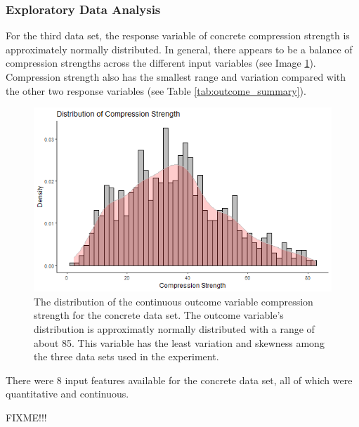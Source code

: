 \documentclass[10pt]{article}\usepackage[]{graphicx}\usepackage[]{xcolor}
\begin{document}
\subsubsection{Exploratory Data Analysis}
For the third data set, the response variable of concrete compression strength is approximately normally distributed. In general, there appears to be a balance of compression strengths across the different input variables (see Image \ref{img:concrete_dist}). Compression strength also has the smallest range and variation compared with the other two response variables (see Table \ref{tab:outcome_summary}).

\begin{figure}[htp]
  \centering
  \includegraphics[scale=0.8]{EDA/concrete_response_dist.png}
  \caption{The distribution of the continuous outcome variable compression strength for the concrete data set. The outcome variable's distribution is approximatly normally distributed with a range of about 85. This variable has the least variation and skewness among the three data sets used in the experiment.}
  \label{img:concrete_dist}
\end{figure}

\newpage

There were 8 input features available for the concrete data set, all of which were quantitative and continuous. 

FIXME!!!
\end{document}
